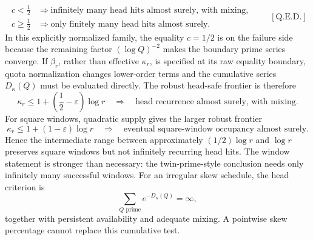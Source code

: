 \begin{equation*}
\begin{aligned}
c < \frac12
&\Longrightarrow
\text{infinitely many head hits almost surely, with mixing},\\
c\ge\frac12
&\Longrightarrow
\text{only finitely many head hits almost surely}.
\end{aligned}
\qquad[\text{Q.E.D.}]
\end{equation*}
In this explicitly normalized family, the equality $c=1/2$ is on the failure side because the remaining factor $(\log Q)^{-2}$ makes the boundary prime series converge. If $\beta_r$, rather than effective $\kappa_r$, is specified at its raw equality boundary, quota normalization changes lower-order terms and the cumulative series $D_{\kappa}(Q)$ must be evaluated directly.
The robust head-safe frontier is therefore
\begin{equation*}
\kappa_r
\le
1+\left(\frac12-\varepsilon\right)\log r
\quad\Longrightarrow\quad
\text{head recurrence almost surely, with mixing}.
\end{equation*}
For square windows, quadratic supply gives the larger robust frontier
\begin{equation*}
\kappa_r
\le
1+(1-\varepsilon)\log r
\quad\Longrightarrow\quad
\text{eventual square-window occupancy almost surely}.
\end{equation*}
Hence the intermediate range between approximately $(1/2)\log r$ and $\log r$ preserves square windows but not infinitely recurring head hits. The window statement is stronger than necessary: the twin-prime-style conclusion needs only infinitely many successful windows.
For an irregular skew schedule, the head criterion is
\begin{equation*}
\sum_{Q\text{ prime}}e^{-D_{\kappa}(Q)}=\infty,
\end{equation*}
together with persistent availability and adequate mixing. A pointwise skew percentage cannot replace this cumulative test.

